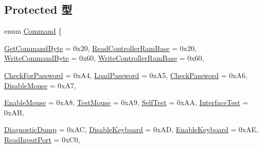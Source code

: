 \subsection*{Protected 型}
\begin{DoxyCompactItemize}
\item 
enum \hyperlink{classX86ISA_1_1I8042_a2afce0a47a93eee73a314d53e4890153}{Command} \{ \par
\hyperlink{classX86ISA_1_1I8042_a2afce0a47a93eee73a314d53e4890153a23d5de50ab3986c273f16d27873759b8}{GetCommandByte} =  0x20, 
\hyperlink{classX86ISA_1_1I8042_a2afce0a47a93eee73a314d53e4890153a9b0985cd9d73a7881a7453e9287fc020}{ReadControllerRamBase} =  0x20, 
\hyperlink{classX86ISA_1_1I8042_a2afce0a47a93eee73a314d53e4890153ab1dea94380ecd4e4c89e930df17d8d47}{WriteCommandByte} =  0x60, 
\hyperlink{classX86ISA_1_1I8042_a2afce0a47a93eee73a314d53e4890153a05cf4c570a5283bcd19744ece80507ea}{WriteControllerRamBase} =  0x60, 
\par
\hyperlink{classX86ISA_1_1I8042_a2afce0a47a93eee73a314d53e4890153a22b61ddbb05a5f9d258cd86e4f257cca}{CheckForPassword} =  0xA4, 
\hyperlink{classX86ISA_1_1I8042_a2afce0a47a93eee73a314d53e4890153a2eaca5606959cbc70001d3138ceda8b6}{LoadPassword} =  0xA5, 
\hyperlink{classX86ISA_1_1I8042_a2afce0a47a93eee73a314d53e4890153a015a89c4c142f0f69d5ac2cb7bf56b9c}{CheckPassword} =  0xA6, 
\hyperlink{classX86ISA_1_1I8042_a2afce0a47a93eee73a314d53e4890153abbe97dae342dfdf3e85a257c90a6ce60}{DisableMouse} =  0xA7, 
\par
\hyperlink{classX86ISA_1_1I8042_a2afce0a47a93eee73a314d53e4890153a16c1a67575ff1313d2c25473e8ac04e4}{EnableMouse} =  0xA8, 
\hyperlink{classX86ISA_1_1I8042_a2afce0a47a93eee73a314d53e4890153a6277be2e9193123b1eac49cca489fc0c}{TestMouse} =  0xA9, 
\hyperlink{classX86ISA_1_1I8042_a2afce0a47a93eee73a314d53e4890153a9248a447bc1c5001d5692afd5fc86f06}{SelfTest} =  0xAA, 
\hyperlink{classX86ISA_1_1I8042_a2afce0a47a93eee73a314d53e4890153a1c8233858c433f8bdbc3ce5185c0a101}{InterfaceTest} =  0xAB, 
\par
\hyperlink{classX86ISA_1_1I8042_a2afce0a47a93eee73a314d53e4890153a099644eade2e1c756daae13c264ba5b8}{DiagnosticDump} =  0xAC, 
\hyperlink{classX86ISA_1_1I8042_a2afce0a47a93eee73a314d53e4890153aeb0e477719ae6fd34645beef2a1ad752}{DisableKeyboard} =  0xAD, 
\hyperlink{classX86ISA_1_1I8042_a2afce0a47a93eee73a314d53e4890153a1f7b43427403a4c6f1574b16c967cecc}{EnableKeyboard} =  0xAE, 
\hyperlink{classX86ISA_1_1I8042_a2afce0a47a93eee73a314d53e4890153a8509d4fd3b0205f744f648a4bc2052d7}{ReadInputPort} =  0xC0, 
\par

\end{DoxyCompactItemize}
